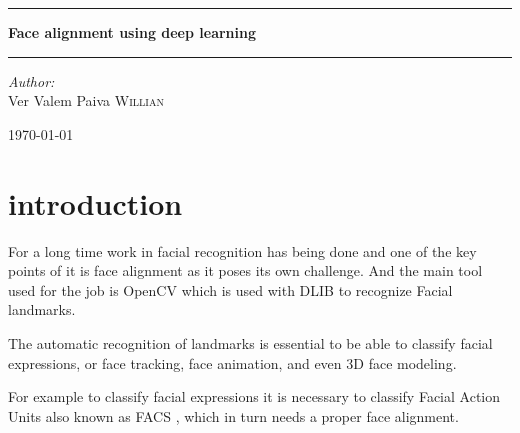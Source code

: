 \documentclass[11pt]{article}
\date{}
\title{}
\begin{document}
\begin{titlepage}
\begin{center}


\textsc{\LARGE}\\[1.5cm]

\textsc{\Large}\\[0.5cm]


\vspace{1cm}
\hrule
\vspace{1cm}


{\huge \bfseries Face alignment using deep learning}


\vspace{1cm}
\hrule
\vspace{1cm}


\begin{minipage}{0.4\textwidth}
\emph{Author:} \\
Ver Valem Paiva \textsc{Willian}\\
\end{minipage}

\vfill

{\large \today}

\end{center}
\end{titlepage}


\tableofcontents
\newpage



\section{introduction}
\label{sec:org211dc5a}

For a long time work in facial recognition has being done and one of the key
points of it is face alignment as it poses its own challenge.
And the main tool used for the job is OpenCV which is used with DLIB to
recognize Facial landmarks.

The automatic recognition of landmarks is essential to be able to classify
facial expressions, or face tracking, face animation, and even 3D face
modeling.

For example to classify facial expressions it is necessary to classify
Facial Action Units also known as FACS \cite{ekman1977facial}, which in turn
needs a proper face alignment.
\end{document}

